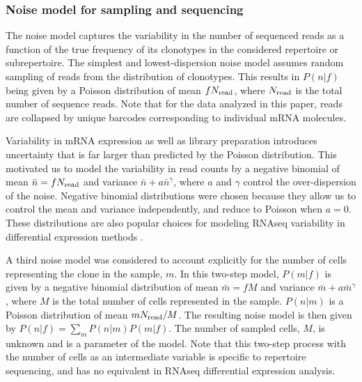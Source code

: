\documentclass[pre,twocolumn,english,longbibliography]{revtex4}
\newcommand{\<}{\langle}
\renewcommand{\>}{\rangle}
\begin{document}
\subsubsection*{Noise model for sampling and sequencing}

The noise model captures the variability in the number of sequenced reads as a function of the true frequency of its clonotypes in the considered repertoire or subrepertoire. The simplest and lowest-dispersion noise model assumes random sampling of reads from the distribution of clonotypes. This results in $P(n|f)$ being given by a Poisson distribution of mean $fN_{\rm read}$, where $N_{\rm read}$ is the total number of sequence reads. Note that for the data analyzed in this paper, reads are collapsed by unique barcodes corresponding to individual mRNA molecules. 

Variability in mRNA expression as well as library preparation introduces uncertainty that is far larger than predicted by the Poisson distribution. This motivated us to model the variability in read counts by a negative binomial of mean $\bar n=fN_{\rm read}$ and variance $\bar n+a\bar n^\gamma$, where $a$ and $\gamma$ control the over-dispersion of the noise. Negative binomial distributions were chosen because they allow us to control the mean and variance independently, and reduce to Poisson when $a=0$. These distributions are also popular choices for modeling RNAseq variability in differential expression methods \cite{Robinson2010,Love2014}.

A third noise model was considered to account explicitly for the number of cells representing the clone in the sample, $m$. In this two-step model, $P(m|f)$ is given by a negative binomial distribution of mean $\bar m=fM$ and variance $\bar m+a\bar m^\gamma$, where $M$ is the total number of cells represented in the sample. $P(n|m)$ is a Poisson distribution of mean $mN_{\rm read}/M$. The resulting noise model is then given by $P(n|f)=\sum_m P(n|m)P(m|f)$. The number of sampled cells, $M$, is unknown and is a parameter of the model. Note that this two-step process with the number of cells as an intermediate variable is specific to repertoire sequencing, and has no equivalent in RNAseq differential expression analysis.
\end{document}
